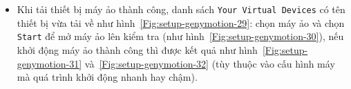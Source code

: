 \documentclass[13pt,a4paper]{extreport}
\begin{document}
\begin{itemize}
\begin{itemize}
					\item Khi tải thiết bị máy ảo thành công, danh sách \verb|Your Virtual Devices| có tên thiết bị vừa tải về như hình~\ref{Fig:setup-genymotion-29}: chọn máy ảo và chọn \verb|Start| để mở máy ảo lên kiểm tra (như hình~\ref{Fig:setup-genymotion-30}), nếu khởi động máy ảo thành công thì được kết quả như hình~\ref{Fig:setup-genymotion-31} và~\ref{Fig:setup-genymotion-32} (tùy thuộc vào cấu hình máy mà quá trình khởi động nhanh hay chậm).
						\begin{figure}[!h]
							\begin{center}	
								\hspace{.5cm}
								\\

\end{center}
\end{figure}
\end{itemize}
\end{itemize}
\end{document}
